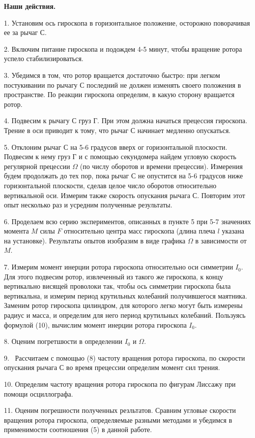 \documentclass[14pt]{article}
\begin{document}
\vspace{1cm}
\textbf{Наши действия.}
\vspace{1cm}

1. Установим ось гироскопа в горизонтальное положение, осторожно поворачивая ее за рычаг С.

2. Включим питание гироскопа и подождем 4-5 минут, чтобы вращение ротора успело стабилизироваться.

3. Убедимся в том, что ротор вращается достаточно быстро: при легком постукивании по рычагу С последний не должен изменять своего положения в пространстве. По реакции гироскопа определим, в какую сторону вращается ротор.

4. Подвесим к рычагу С груз Г. При этом должна начаться прецессия гироскопа. Трение в оси приводит к тому, что рычаг С начинает медленно опускаться.

5. Отклоним рычаг С на 5-6 градусов вверх ог горизонтальной плоскости. Подвесим к нему груз Г и с помощью секундомера найдем угловую скорость регулярной прецессии $\Omega$ (по числу оборотов и времени прецессии). Измерения будем продолжать до тех пор, пока рычаг С не опустится на 5-6 градусов ниже горизонтальной плоскости, сделав целое число оборотов относительно вертикальной оси. Измерим также скорость опускания рычага С. Повторим этот опыт несколько раз и усредним полученные результаты.

6. Проделаем всю серию экспериментов, описанных в пункте 5 при 5-7 значениях момента $M$ силы $F$ относительно центра масс гироскопа (длина плеча $l$ указана на установке). Результаты опытов изобразим в виде графика $\Omega$ в зависимости от $M$.

7. Измерим момент инерции ротора гироскопа относительно оси симметрии $I_0$. Для этого подвесим ротор, извлеченный из такого же гироскопа, к концу вертикально висящей проволоки так, чтобы ось симметрии гироскопа была вертикальна, и измерим период крутильных колебаний получившегося маятника. Заменим ротор гироскопа цилиндром, для которого легко могут быть измерены радиус и масса, и определим для него период крутильных колебаний. Пользуясь формулой (10), вычислим момент инерции ротора гироскопа $I_0$.

8. Оценим погретшюсти в определении $I_0$ и $\Omega$.

9. ~Рассчитаем с помощью (8) частоту вращения ротора гироскопа, по скорости опускания рычага С во время прецессии определим момент сил трения.

10. Определим частоту вращения ротора гироскопа по фигурам Лиссажу при помощи осциллографа.

11. Оценим погрешности полученных резльтатов. Сравним угловые скорости вращения ротора гироскопа, определяемые разными методами и убедимся в применимости соотношения (5) в данной работе.
\end{document}
